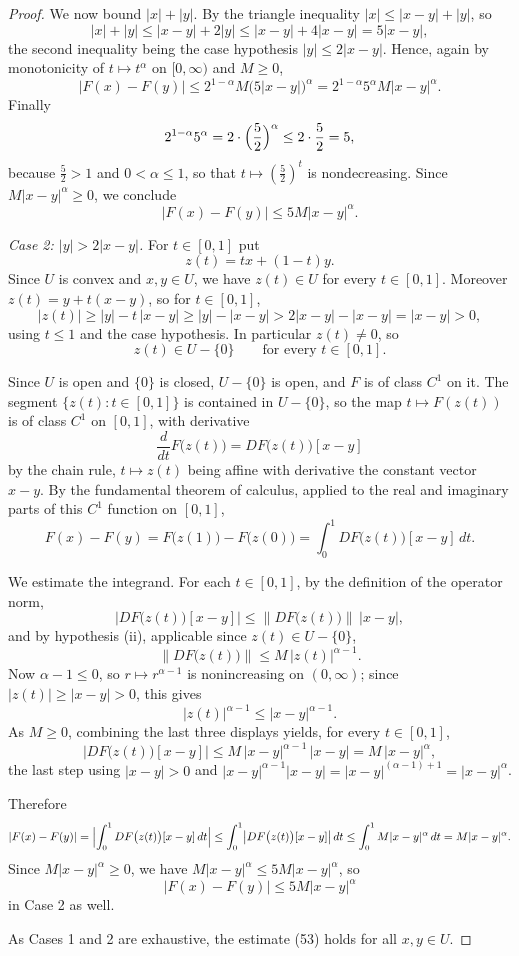 \begin{proof}
We now bound $|x|+|y|$.  By the triangle inequality $|x|\le|x-y|+|y|$, so
\[
  |x|+|y|\le|x-y|+2|y|\le|x-y|+4|x-y|=5|x-y| ,
\]
the second inequality being the case hypothesis $|y|\le2|x-y|$.  Hence,
again by monotonicity of $t\mapsto t^\alpha$ on $[0,\infty)$ and $M\ge0$,
\[
  |F(x)-F(y)|\le2^{1-\alpha}M\bigl(5|x-y|\bigr)^{\alpha}
  =2^{1-\alpha}5^{\alpha}M|x-y|^{\alpha}.
\]
Finally
\[
  2^{1-\alpha}5^{\alpha}=2\cdot\Bigl(\frac52\Bigr)^{\alpha}\le2\cdot\frac52=5 ,
\]
because $\frac52>1$ and $0<\alpha\le1$, so that
$t\mapsto(\frac52)^{t}$ is nondecreasing.  Since $M|x-y|^\alpha\ge0$, we
conclude
\[
  |F(x)-F(y)|\le5M|x-y|^{\alpha}.
\]

\emph{Case 2: $|y|>2|x-y|$.}  For $t\in[0,1]$ put
\[
  z(t)=tx+(1-t)y .
\]
Since $U$ is convex and $x,y\in U$, we have $z(t)\in U$ for every
$t\in[0,1]$.  Moreover $z(t)=y+t(x-y)$, so for $t\in[0,1]$,
\[
  |z(t)|\ge|y|-t\,|x-y|\ge|y|-|x-y|>2|x-y|-|x-y|=|x-y|>0 ,
\]
using $t\le1$ and the case hypothesis.  In particular $z(t)\neq0$, so
\[
  z(t)\in U-\{0\}\qquad\text{for every }t\in[0,1].
\]

Since $U$ is open and $\{0\}$ is closed, $U-\{0\}$ is open, and $F$ is of
class $C^1$ on it.  The segment $\{z(t):t\in[0,1]\}$ is contained in
$U-\{0\}$, so the map $t\mapsto F(z(t))$ is of class $C^1$ on $[0,1]$, with
derivative
\[
  \frac{d}{dt}F\bigl(z(t)\bigr)=DF\bigl(z(t)\bigr)[x-y]
\]
by the chain rule, $t\mapsto z(t)$ being affine with derivative the constant
vector $x-y$.  By the fundamental theorem of calculus, applied to the real and
imaginary parts of this $C^1$ function on $[0,1]$,
\[
  F(x)-F(y)=F\bigl(z(1)\bigr)-F\bigl(z(0)\bigr)
  =\int_0^1 DF\bigl(z(t)\bigr)[x-y]\,dt .
\]

We estimate the integrand.  For each $t\in[0,1]$, by the definition of the
operator norm,
\[
  \bigl|DF\bigl(z(t)\bigr)[x-y]\bigr|\le\bigl\|DF\bigl(z(t)\bigr)\bigr\|\,|x-y| ,
\]
and by hypothesis (ii), applicable since $z(t)\in U-\{0\}$,
\[
  \bigl\|DF\bigl(z(t)\bigr)\bigr\|\le M\,|z(t)|^{\alpha-1}.
\]
Now $\alpha-1\le0$, so $r\mapsto r^{\alpha-1}$ is nonincreasing on
$(0,\infty)$; since $|z(t)|\ge|x-y|>0$, this gives
\[
  |z(t)|^{\alpha-1}\le|x-y|^{\alpha-1}.
\]
As $M\ge0$, combining the last three displays yields, for every $t\in[0,1]$,
\[
  \bigl|DF\bigl(z(t)\bigr)[x-y]\bigr|\le M\,|x-y|^{\alpha-1}\,|x-y|
  =M\,|x-y|^{\alpha},
\]
the last step using $|x-y|>0$ and
$|x-y|^{\alpha-1}|x-y|=|x-y|^{(\alpha-1)+1}=|x-y|^{\alpha}$.

Therefore
\[
  |F(x)-F(y)|=\Bigl|\int_0^1 DF\bigl(z(t)\bigr)[x-y]\,dt\Bigr|
  \le\int_0^1\bigl|DF\bigl(z(t)\bigr)[x-y]\bigr|\,dt
  \le\int_0^1 M|x-y|^{\alpha}\,dt=M|x-y|^{\alpha}.
\]
Since $M|x-y|^{\alpha}\ge0$, we have $M|x-y|^\alpha\le5M|x-y|^\alpha$, so
\[
  |F(x)-F(y)|\le5M|x-y|^{\alpha}
\]
in Case 2 as well.

As Cases 1 and 2 are exhaustive, the estimate (53) holds for all $x,y\in U$.
\end{proof}
